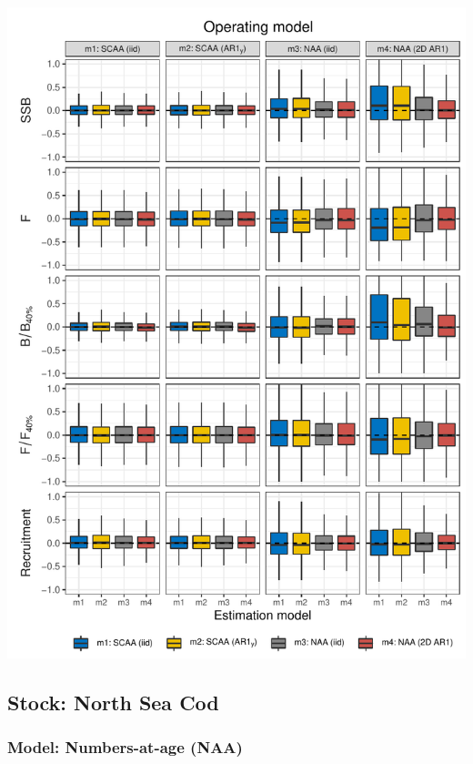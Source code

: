 \documentclass[]{article}
\begin{document}
\includegraphics[width=6in]{wham-sim-paper_files/figure-latex/unnamed-chunk-3-2}

\pagebreak

\pagebreak

\hypertarget{stock-north-sea-cod}{%
\subsection{Stock: North Sea Cod}\label{stock-north-sea-cod}}

\hypertarget{model-numbers-at-age-naa-2}{%
\subsubsection{Model: Numbers-at-age
(NAA)}\label{model-numbers-at-age-naa-2}}
\end{document}
